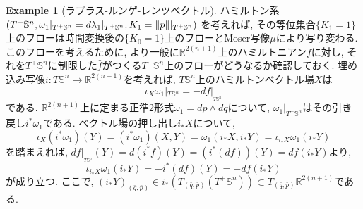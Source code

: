 \documentclass[a4paper]{ujarticle}
\numberwithin{equation}{section}
\theoremstyle{definition}
\newtheorem{example}{Example}
\begin{document}
\begin{example}[ラプラス-ルンゲ-レンツベクトル]
            ハミルトン系$(T^{+}\mathbb{S}^{n}, \omega_1|_{T^{+} \mathbb{S}^{n}} = d \lambda_1|_{T^{+} \mathbb{S}^{n}}, K_1 = \norm{p}|_{T^{+} \mathbb{S}^n})$
            を考えれば, その等位集合$\{K_1 = 1\}$上のフローは時間変換後の$\{K_0 = 1\}$上のフローとMoser写像$\mu$により写り変わる.
            このフローを考えるために, より一般に$\mathbb{R}^{2(n+1)}$上のハミルトニアン$f$に対し, 
            それを$T^{+} \mathbb{S}^{n}$に制限した$\hat{f}$がつくる$T^{+} \mathbb{S}^{n}$上のフローがどうなるか確認しておく.
            埋め込み写像$i : T \mathbb{S}^n \rightarrow \mathbb{R}^{2(n+1)}$を考えれば,
            $T \mathbb{S}^n$上のハミルトンベクトル場$X$は
            \[
                \iota_{X}\omega_1|_{T \mathbb{S}^n} = - d f|_{_{T \mathbb{S}^n}}
            \]
            である. $\mathbb{R}^{2(n+1)}$上に定まる正準$2$形式$\omega_1 = d \bar{p} \wedge d \bar{q}$について,
            $\omega_1|_{T^{+} \mathbb{S}^{n}}$はその引き戻し$i^{*} \omega_1$である.
            ベクトル場の押し出し$i_{*} X$について, 
            \[
                \iota_{X}(i^{*}\omega_1)(Y) = (i^{*}\omega_1)(X, Y) = \omega_1(i_{*} X, i_{*}Y) = \iota_{i_{*}X} \omega_1(i_{*}Y)
            \]
            を踏まえれば, $d f|_{_{T \mathbb{S}^n}}(Y) = d(i^{*}f)(Y) = (i^{*}(d f))(Y) = d f(i_{*}Y)$より, 
            \[
                \iota_{i_{*}X} \omega_1(i_{*}Y) = - i^{*}(d f)(Y) = - d f(i_{*}Y)
            \]
            が成り立つ. 
            ここで, $(i_{*} Y)_{(\bar{q}, \bar{p})} \in i_{*}(T_{(\bar{q}, \bar{p})}(T^{+} \mathbb{S}^{n})) \subset T_{(\bar{q}, \bar{p})} \mathbb{R}^{2(n+1)}$である.
            

\end{example}
\end{document}
